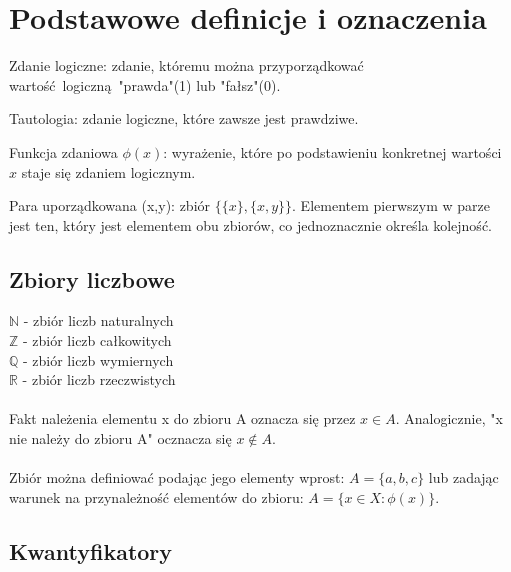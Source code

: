 \section{Podstawowe definicje i oznaczenia}
    \begin{definition}
        Zdanie logiczne: zdanie, któremu można przyporządkować wartość logiczną "prawda"(1) lub "fałsz"(0).
    \end{definition}
    \begin{definition}
        Tautologia: zdanie logiczne, które zawsze jest prawdziwe.
    \end{definition}
    \begin{definition}
        Funkcja zdaniowa $\phi(x)$: wyrażenie, które po podstawieniu konkretnej wartości $x$ staje się zdaniem logicznym.
    \end{definition}
    \begin{definition}
        Para uporządkowana (x,y): zbiór $\{\{x\},\{x,y\}\}$. Elementem pierwszym w parze jest ten, który jest elementem obu zbiorów, co jednoznacznie określa kolejność.
    \end{definition}

    \subsection{Zbiory liczbowe}
        $\mathbb{N}$ - zbiór liczb naturalnych\\
        $\mathbb{Z}$ - zbiór liczb całkowitych\\
        $\mathbb{Q}$ - zbiór liczb wymiernych\\
        $\mathbb{R}$ - zbiór liczb rzeczwistych

        \paragraph{} Fakt należenia elementu x do zbioru A oznacza się przez $x \in A$. Analogicznie, "x nie należy do zbioru A" ocznacza się $x \notin A$.
        \paragraph{} Zbiór można definiować podając jego elementy wprost: $A = \{a, b, c\}$ lub zadając warunek na przynależność elementów do zbioru: $A = \{x \in X: \phi (x)\}$. 

    \subsection{Kwantyfikatory}
